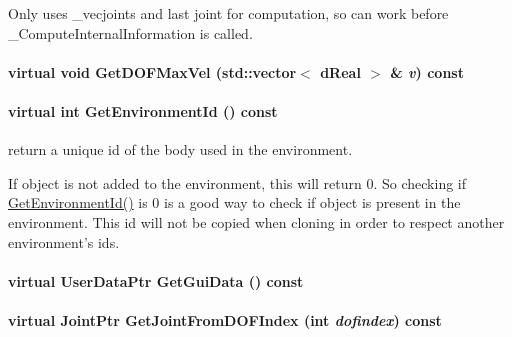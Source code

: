 Only uses \_\-vecjoints and last joint for computation, so can work before \_\-ComputeInternalInformation is called. \hypertarget{classOpenRAVE_1_1KinBody_a1e9ec62d458f7c3b1ea298fa0499b25e}{
\paragraph[{GetDOFMaxVel}]{\setlength{\rightskip}{0pt plus 5cm}virtual void GetDOFMaxVel (std::vector$<$ dReal $>$ \& {\em v}) const}\hfill}
\label{classOpenRAVE_1_1KinBody_a1e9ec62d458f7c3b1ea298fa0499b25e}
\hypertarget{classOpenRAVE_1_1KinBody_a51f880cf26774cd34ab9634bd518b955}{
\paragraph[{GetEnvironmentId}]{\setlength{\rightskip}{0pt plus 5cm}virtual int GetEnvironmentId () const}\hfill}
\label{classOpenRAVE_1_1KinBody_a51f880cf26774cd34ab9634bd518b955}


return a unique id of the body used in the environment. 

If object is not added to the environment, this will return 0. So checking if \hyperlink{classOpenRAVE_1_1KinBody_a51f880cf26774cd34ab9634bd518b955}{GetEnvironmentId()} is 0 is a good way to check if object is present in the environment. This id will not be copied when cloning in order to respect another environment's ids. \hypertarget{classOpenRAVE_1_1KinBody_ab57d127f75d79fb8bb00524894de8453}{
\paragraph[{GetGuiData}]{\setlength{\rightskip}{0pt plus 5cm}virtual UserDataPtr GetGuiData () const}\hfill}
\label{classOpenRAVE_1_1KinBody_ab57d127f75d79fb8bb00524894de8453}
\hypertarget{classOpenRAVE_1_1KinBody_ab386b6dd306aca447113b8892c0fc265}{
\paragraph[{GetJointFromDOFIndex}]{\setlength{\rightskip}{0pt plus 5cm}virtual JointPtr GetJointFromDOFIndex (int {\em dofindex}) const}\hfill}
\label{classOpenRAVE_1_1KinBody_ab386b6dd306aca447113b8892c0fc265}


